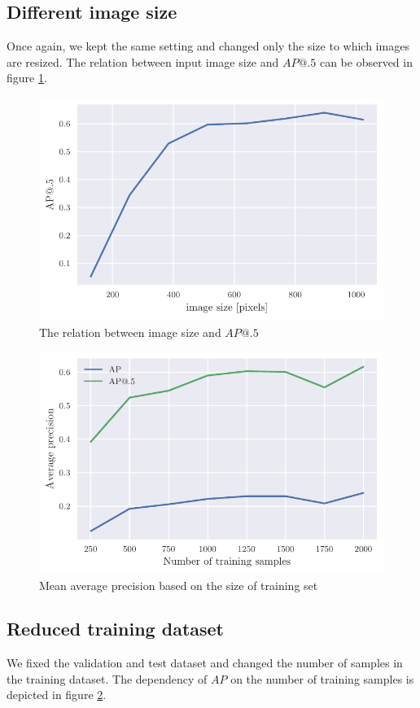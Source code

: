 \subsection{Different image size}
Once again, we kept the same setting and changed only the size to which images are resized. The relation between input image size and $AP@.5$ can be observed in figure \ref{fig:img_sizes}.

\begin{paracol}{2}
    \begin{figure}
        \centering
        \includegraphics[width=0.99\linewidth]{images/img_size_dependency.pdf}
        \caption{The relation between image size and $AP@.5$}
        \label{fig:img_sizes}
    \end{figure}
    \switchcolumn
    \begin{figure}
        \centering
        \includegraphics[width=0.99\linewidth]{images/training_set_dependency.pdf}
        \caption{Mean average precision based on the size of training set}
        \label{fig:training_set_sizes}
    \end{figure}
\end{paracol}

\subsection{Reduced training dataset}
We fixed the validation and test dataset and changed the number of samples in the training dataset. The dependency of $AP$ on the number of training samples is depicted in figure \ref{fig:training_set_sizes}.

